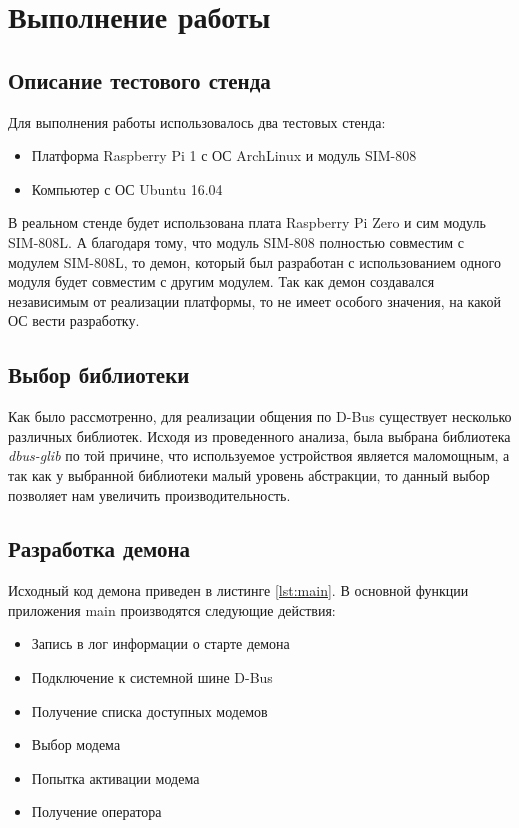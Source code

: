 \section{Выполнение работы}
\subsection{Описание тестового стенда}
Для выполнения работы использовалось два тестовых стенда:
\begin{itemize}
\item Платформа Raspberry Pi 1 с ОС ArchLinux и модуль SIM-808
\item Компьютер с ОС Ubuntu 16.04
\end{itemize}

В реальном стенде будет использована плата Raspberry Pi Zero и сим модуль SIM-808L. А благодаря тому, что модуль SIM-808 полностью совместим с модулем SIM-808L, то демон, который был разработан с использованием одного модуля будет совместим с другим модулем. Так как демон создавался независимым от реализации платформы, то не имеет особого значения, на какой ОС вести разработку.

\subsection{Выбор библиотеки}
Как было рассмотренно, для реализации общения по D-Bus существует несколько различных библиотек. Исходя из проведенного анализа, была выбрана библиотека \textit{dbus-glib} по той причине, что используемое устройствоя является маломощным, а так как у выбранной библиотеки малый уровень абстракции, то данный выбор позволяет нам увеличить производительность.

\subsection{Разработка демона}
Исходный код демона приведен в листинге \ref{lst:main}. В основной функции приложения main производятся следующие действия:
\begin{itemize}
\item Запись в лог информации о старте демона 
\item Подключение к системной шине D-Bus
\item Получение списка доступных модемов
\item Выбор модема
\item Попытка активации модема
\item Получение оператора
\end{itemize}


